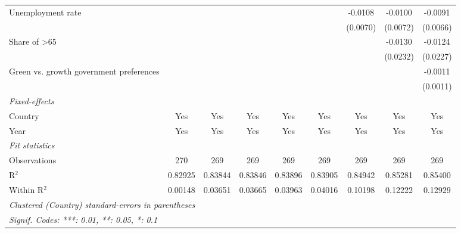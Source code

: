 \begin{table}[htbp]
\begin{tabular}{lcccccccc}
      Unemployment rate                                                        &          &          &          &          &          & -0.0108  & -0.0100       & -0.0091\\   
                                                                               &          &          &          &          &          & (0.0070) & (0.0072)      & (0.0066)\\   
      Share of >65                                                             &          &          &          &          &          &          & -0.0130       & -0.0124\\   
                                                                               &          &          &          &          &          &          & (0.0232)      & (0.0227)\\   
      Green vs. growth government preferences                                  &          &          &          &          &          &          &               & -0.0011\\   
                                                                               &          &          &          &          &          &          &               & (0.0011)\\   
      \midrule
      \emph{Fixed-effects}\\
      Country                                                                  & Yes      & Yes      & Yes      & Yes      & Yes      & Yes      & Yes           & Yes\\  
      Year                                                                     & Yes      & Yes      & Yes      & Yes      & Yes      & Yes      & Yes           & Yes\\  
      \midrule
      \emph{Fit statistics}\\
      Observations                                                             & 270      & 269      & 269      & 269      & 269      & 269      & 269           & 269\\  
      R$^2$                                                                    & 0.82925  & 0.83844  & 0.83846  & 0.83896  & 0.83905  & 0.84942  & 0.85281       & 0.85400\\  
      Within R$^2$                                                             & 0.00148  & 0.03651  & 0.03665  & 0.03963  & 0.04016  & 0.10198  & 0.12222       & 0.12929\\  
      \midrule \midrule
      \multicolumn{9}{l}{\emph{Clustered (Country) standard-errors in parentheses}}\\
      \multicolumn{9}{l}{\emph{Signif. Codes: ***: 0.01, **: 0.05, *: 0.1}}\\
   \end{tabular}
\end{table}


